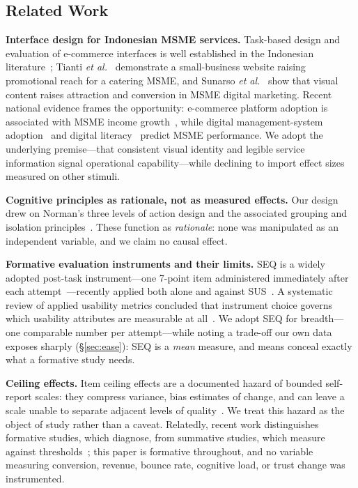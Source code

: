 \documentclass[conference]{IEEEtran}
\begin{document}
\subsection{Related Work}
\label{sec:related}

\textbf{Interface design for Indonesian MSME services.} Task-based design
and evaluation of e-commerce interfaces is well established in the
Indonesian literature~\cite{dinata,saputra,zunaidi,zakiyamani,nugrahaini};
Tianti \emph{et al.}~\cite{tianti} demonstrate a small-business website
raising promotional reach for a catering MSME, and Sunarso
\emph{et al.}~\cite{sunarso} show that visual content raises attraction and
conversion in MSME digital marketing. Recent national evidence frames the
opportunity: e-commerce platform adoption is associated with MSME income
growth~\cite{roihan}, while digital management-system
adoption~\cite{nurachmad} and digital literacy~\cite{muhtadin} predict MSME
performance. We adopt the underlying premise---that consistent visual
identity and legible service information signal operational
capability---while declining to import effect sizes measured on other
stimuli.

\textbf{Cognitive principles as rationale, not as measured effects.} Our
design drew on Norman's three levels of action design and the associated
grouping and isolation principles~\cite{norman}. These function as
\emph{rationale}: none was manipulated as an independent variable, and we
claim no causal effect.

\textbf{Formative evaluation instruments and their limits.} SEQ is a
widely adopted post-task instrument---one 7-point item administered
immediately after each attempt~\cite{sauro}---recently applied both alone
and against SUS~\cite{khodijah,azizah,purnamasari}. A systematic review of
applied usability metrics concluded that instrument choice governs which
usability attributes are measurable at all~\cite{wronikowska}. We adopt
SEQ for breadth---one comparable number per attempt---while noting a
trade-off our own data exposes sharply (\S\ref{sec:ease}): SEQ is a
\emph{mean} measure, and means conceal exactly what a formative study
needs.

\textbf{Ceiling effects.} Item ceiling effects are a documented hazard of
bounded self-report scales: they compress variance, bias estimates of
change, and can leave a scale unable to separate adjacent levels of
quality~\cite{edwards,sabella}. We treat this hazard as the object of
study rather than a caveat. Relatedly, recent work distinguishes formative
studies, which diagnose, from summative studies, which measure against
thresholds~\cite{schnitzbauer,salwei}; this paper is formative throughout,
and no variable measuring conversion, revenue, bounce rate, cognitive load,
or trust change was instrumented.
\end{document}
